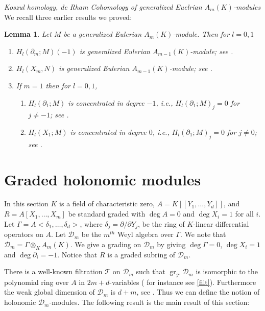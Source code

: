 \documentclass{amsart}
\newcommand{\D}{\mathcal{D} }
\newcommand{\T}{\mathcal{T} }
\newcommand{\gr}{\operatorname{gr}}
\theoremstyle{plain}
\newtheorem{lemma}[theorem]{Lemma}
\theoremstyle{definition}
\theoremstyle{remark}
\begin{document}
 \s \emph{Koszul homology, de Rham Cohomology of generalized Euelrian $A_m(K)$-modules}
 We recall three earlier results we proved:
 \begin{lemma}\label{sushil}
 Let $M$ be a generalized Eulerian $A_m(K)$-module. Then for $l = 0, 1$
 \begin{enumerate}[\rm (1)]
  \item  $H_l(\partial_m; M)(-1)$ is generalized Eulerian $A_{m-1}(K)$-module; see \cite[3.2]{P2}.
  \item $H_l(X_m, N)$  is generalized Eulerian $A_{m-1}(K)$-module; see \cite[5.3]{PS}.
  \item If $m = 1$ then for $l = 0, 1$,
  \begin{enumerate}[\rm (a)]
  \item 
  $H_l(\partial_1; M)$ is concentrated in degree $-1$, i.e., $H_l(\partial_1; M)_j = 0$ for $j \neq -1$; see \cite[3.5]{P2}.
  \item
  $H_l(X_1; M)$ is concentrated in degree $0$, i.e., $H_l(\partial_1; M)_j = 0$ for $j \neq 0$; see \cite[5.5]{PS}.
  \end{enumerate}
 \end{enumerate}
 \end{lemma}

 
 
 
 
 
 
 
 
 
 
 
 
 
 
 
 
\section{Graded holonomic modules}
\s \label{setup-graded-holonomic} In this section $K$ is a field of characteristic zero, $A = K[[Y_1,\ldots, Y_d]]$, 
and $R = A[X_1,\ldots, X_m]$ be standard graded with $\deg A = 0$ and $\deg X_i = 1$ for all $i$.
Let
$\Gamma = A<\delta_1,\ldots, \delta_d>$,
 where $\delta_j = \partial/\partial Y_j$, be the ring of $K$-linear differential operators on $A$. 
 Let $\D_m$ be the $m^{th}$ Weyl algebra over $\Gamma$. We note that $\D_m = \Gamma \otimes_K A_m(K)$.
We give a grading on $\D_m$ by giving $\deg \Gamma = 0$, $\deg X_i = 1$ and $\deg \partial_i = -1$. Notice that
$R$ is a graded subring of $\D_m$. 

There is a well-known filtration $\T$ on $\D_m$ such that
$\gr_\T \D_m $ is isomorphic to the polynomial ring over $A$ in $2m + d$-variables
( for instance see \ref{filt}). Furthermore the weak global dimension of $\D_m$ is 
$d + m$, see \cite[3.1.9]{Bjork}. Thus we can define the notion of holonomic $\D_m$-modules. The following result is the main result of this section:
\end{document}
